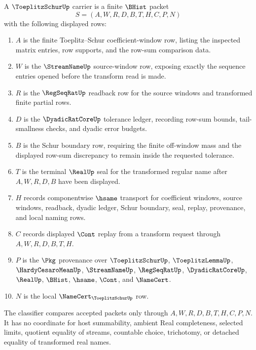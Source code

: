\begin{definition}
\label{def:toeplitz-schur-carrier}
A $\ToeplitzSchurUp$ carrier is a finite $\BHist$ packet
$$
S=(A,W,R,D,B,T,H,C,P,N)
$$
with the following displayed rows:
\begin{enumerate}
\item $A$ is the finite Toeplitz--Schur coefficient-window row, listing the inspected matrix entries, row supports, and the row-sum comparison data.
\item $W$ is the $\StreamNameUp$ source-window row, exposing exactly the sequence entries opened before the transform read is made.
\item $R$ is the $\RegSeqRatUp$ readback row for the source windows and transformed finite partial rows.
\item $D$ is the $\DyadicRatCoreUp$ tolerance ledger, recording row-sum bounds, tail-smallness checks, and dyadic error budgets.
\item $B$ is the Schur boundary row, requiring the finite off-window mass and the displayed row-sum discrepancy to remain inside the requested tolerance.
\item $T$ is the terminal $\RealUp$ seal for the transformed regular name after $A,W,R,D,B$ have been displayed.
\item $H$ records componentwise $\hsame$ transport for coefficient windows, source windows, readback, dyadic ledger, Schur boundary, seal, replay, provenance, and local naming rows.
\item $C$ records displayed $\Cont$ replay from a transform request through $A,W,R,D,B,T,H$.
\item $P$ is the $\Pkg$ provenance over $\ToeplitzSchurUp$, $\ToeplitzLemmaUp$, $\HardyCesaroMeanUp$, $\StreamNameUp$, $\RegSeqRatUp$, $\DyadicRatCoreUp$, $\RealUp$, $\BHist$, $\hsame$, $\Cont$, and $\NameCert$.
\item $N$ is the local $\NameCert_{\ToeplitzSchurUp}$ row.
\end{enumerate}
The classifier compares accepted packets only through $A,W,R,D,B,T,H,C,P,N$. It has no coordinate for host summability, ambient Real completeness, selected limits, quotient equality of streams, countable choice, trichotomy, or detached equality of transformed real names.
\end{definition}

